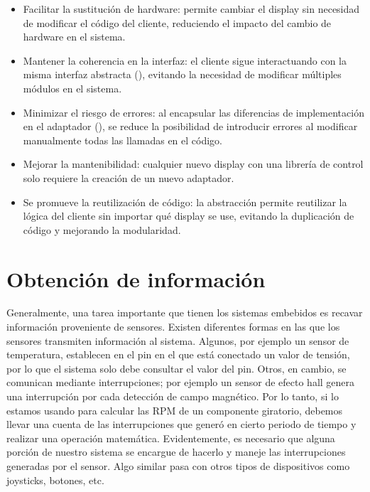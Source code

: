 \begin{itemize}

\item Facilitar la sustitución de hardware: permite cambiar el display sin necesidad de modificar el código del cliente, reduciendo el impacto del cambio de hardware en el sistema.

\item Mantener la coherencia en la interfaz: el cliente sigue interactuando con la misma interfaz abstracta (\Display), evitando la necesidad de modificar múltiples módulos en el sistema.

\item Minimizar el riesgo de errores: al encapsular las diferencias de implementación en el adaptador (\DisplayEmca), se reduce la posibilidad de introducir errores al modificar manualmente todas las llamadas en el código.

\item Mejorar la mantenibilidad: cualquier nuevo display con una librería de control solo requiere la creación de un nuevo adaptador.

\item Se promueve la reutilización de código: la abstracción permite reutilizar la lógica del cliente sin importar qué display se use, evitando la duplicación de código y mejorando la modularidad.
\end{itemize}


\section{Obtención de información}
\label{obtInfo}

Generalmente, una tarea importante que tienen los sistemas embebidos es recavar información proveniente de sensores. Existen diferentes formas en las que los sensores transmiten información al sistema. Algunos, por ejemplo un sensor de temperatura, establecen en el pin en el que está conectado un valor de tensión, por lo que el sistema solo debe consultar el valor del pin. Otros, en cambio, se comunican mediante interrupciones; por ejemplo un sensor de efecto \gls{hall} genera una interrupción por cada detección de campo magnético. Por lo tanto, si lo estamos usando para calcular las \gls{RPM} de un componente giratorio, debemos llevar una cuenta de las interrupciones que generó en cierto periodo de tiempo y realizar una operación matemática. Evidentemente, es necesario que alguna porción de nuestro sistema se encargue de hacerlo y maneje las interrupciones generadas por el sensor. Algo similar pasa con otros tipos de dispositivos como joysticks, botones, etc.

